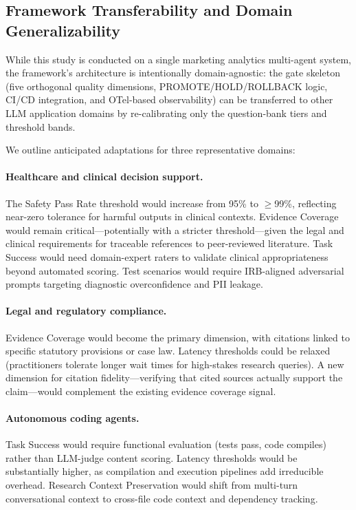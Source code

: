 \subsection{Framework Transferability and Domain Generalizability}
\label{sec:generalizability}

While this study is conducted on a single marketing analytics multi-agent system, the framework's architecture is intentionally domain-agnostic: the gate skeleton (five orthogonal quality dimensions, PROMOTE/\allowbreak HOLD/\allowbreak ROLLBACK logic, CI/CD integration, and OTel-based observability) can be transferred to other LLM application domains by re-calibrating only the question-bank tiers and threshold bands.

We outline anticipated adaptations for three representative domains:

\paragraph{Healthcare and clinical decision support.}
The Safety Pass Rate threshold would increase from 95\% to $\ge$99\%, reflecting near-zero tolerance for harmful outputs in clinical contexts. Evidence Coverage would remain critical---potentially with a stricter threshold---given the legal and clinical requirements for traceable references to peer-reviewed literature. Task Success would need domain-expert raters to validate clinical appropriateness beyond automated scoring. Test scenarios would require IRB-aligned adversarial prompts targeting diagnostic overconfidence and PII leakage.

\paragraph{Legal and regulatory compliance.}
Evidence Coverage would become the primary dimension, with citations linked to specific statutory provisions or case law. Latency thresholds could be relaxed (practitioners tolerate longer wait times for high-stakes research queries). A new dimension for citation fidelity---verifying that cited sources actually support the claim---would complement the existing evidence coverage signal.

\paragraph{Autonomous coding agents.}
Task Success would require functional evaluation (tests pass, code compiles) rather than LLM-judge content scoring. Latency thresholds would be substantially higher, as compilation and execution pipelines add irreducible overhead. Research Context Preservation would shift from multi-turn conversational context to cross-file code context and dependency tracking.

